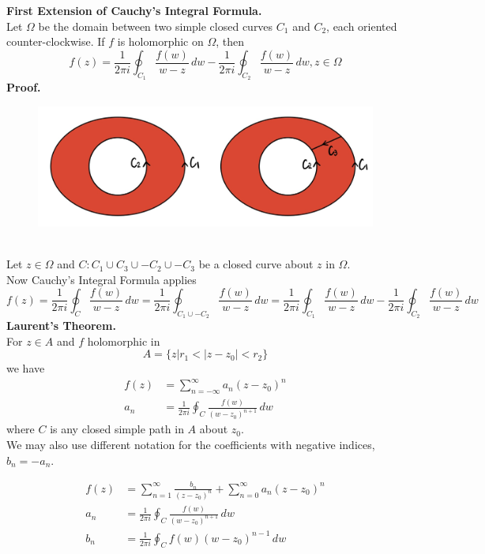 \documentclass[11pt]{article}
\begin{document}
\textbf{First Extension of Cauchy's Integral Formula.} \\
Let $\Omega$ be the domain between two simple closed curves $C_1$ and $C_2$, each oriented counter-clockwise. If $f$ is holomorphic on $\Omega$, then
$$f(z) = \frac{1}{2\pi i} \oint_{C_1} \frac{f(w)}{w - z} \,dw - \frac{1}{2\pi i} \oint_{C_2} \frac{f(w)}{w - z} \,dw, z \in \Omega$$
\textbf{Proof.}\\
\begin{figure}[h]
\includegraphics[scale=0.2]{19_1} 
\centering
\end{figure}
\\
Let $z \in \Omega$ and $C: C_1 \cup C_3 \cup -C_2 \cup -C_3$ be a closed curve about $z$ in $\Omega$. \\
Now Cauchy's Integral Formula applies
$$ f(z) = \frac{1}{2\pi i}\oint_C \frac{f(w)}{w - z} \, dw = \frac{1}{2\pi i}\oint_{C_1\cup -C_2} \frac{f(w)}{w - z} \,dw = \frac{1}{2\pi i} \oint_{C_1} \frac{f(w)}{w - z} \,dw - \frac{1}{2\pi i} \oint_{C_2} \frac{f(w)}{w - z} \,dw$$
\newline
\textbf{Laurent's Theorem.} \\
For $z \in A$ and $f$ holomorphic in 
$$A = \{z|r_1 < |z - z_0| < r_2\}$$
we have 
\begin{align*}
f(z) &= \sum_{n = -\infty}^{\infty} a_n(z - z_0)^n \\
a_n & = \frac{1}{2\pi i}\oint_C \frac{f(w)}{(w - z_0)^{n + 1}}\, dw
\end{align*}
where $C$ is any closed simple path in $A$ about $z_0$. \\
We may also use different notation for the coefficients with negative indices, $b_n = -a_n$. \\
\newline
\begin{minipage}{.5\textwidth}
       \begin{align*}
	f(z) &= \sum_{n = 1}^{\infty}\frac{b_n}{(z - z_0)^n} + \sum_{n = 0}^{\infty} a_n (z-z_0)^n \\
	a_n &= \frac{1}{2\pi i}\oint_C \frac{f(w)}{(w - z_0)^{n + 1}} \, dw \\
	b_n &= \frac{1}{2\pi i}\oint_C f(w)(w - z_0)^{n - 1} \, dw \\
	\end{align*}
  \end{minipage}%
\end{document}
